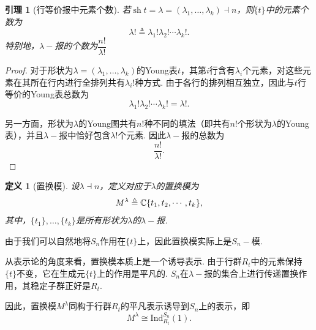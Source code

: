 \documentclass{sjtureport}
\newtheorem{lemma}[theorem]{引理}
\newtheorem{definition}{定义}[chapter]
\DeclareMathOperator{\sh}{sh}
\begin{document}
\begin{lemma}[行等价报中元素个数]
    若$\sh t=\lambda=(\lambda_1,\ldots,\lambda_k)\dashv n$，则$\{t\}$中的元素个数为
    \begin{equation*}
        \lambda !\triangleq \lambda_1!\lambda_2!\cdots\lambda_k!.
    \end{equation*}
    特别地，$\lambda-\!$报的个数为$\dfrac{n!}{\lambda!}$
\end{lemma}
\begin{proof}
    对于形状为$\lambda=(\lambda_1,\ldots,\lambda_k)$的Young表$t$，其第$i$行含有$\lambda_i$个元素，对这些元素在其所在行内进行全排列共有$\lambda_i!$种方式. 由于各行的排列相互独立，因此与$t$行等价的Young表总数为
    \begin{equation*}
        \lambda_1!\lambda_2!\cdots\lambda_k! = \lambda!.
    \end{equation*}
    
    另一方面，形状为$\lambda$的Young图共有$n!$种不同的填法（即共有$n!$个形状为$\lambda$的Young表），并且$\lambda-\!$报中恰好包含$\lambda!$个元素. 因此$\lambda-\!$报的总数为
    \begin{equation*}
        \frac{n!}{\lambda!}.
    \end{equation*}
\end{proof}


\begin{definition}[置换模]
    设$\lambda\dashv n$，定义对应于$\lambda$的置换模为
    \begin{equation*}
        M^\lambda\triangleq \mathbb{C}\qty{{t_1},{t_2},\cdots,{t_k}},
    \end{equation*}
    其中，$\{t_1\},\ldots,\{t_k\}$是所有形状为$\lambda$的$\lambda-\!$报.
\end{definition}

由于我们可以自然地将$S_n$作用在$\{t\}$上，因此置换模实际上是$S_n-\!$模. 

从表示论的角度来看，置换模本质上是一个诱导表示. 由于行群$R_t$中的元素保持$\{t\}$不变，它在生成元$\{t\}$上的作用是平凡的. $S_n$在$\lambda-\!$报的集合上进行传递置换作用，其稳定子群正好是$R_t$.\par 
因此，置换模$M^\lambda$同构于行群$R_t$的平凡表示诱导到$S_n$上的表示，即
\begin{equation*}
    M^\lambda \cong \mathrm{Ind}_{R_t}^{S_n}(1).
\end{equation*}
\end{document}

